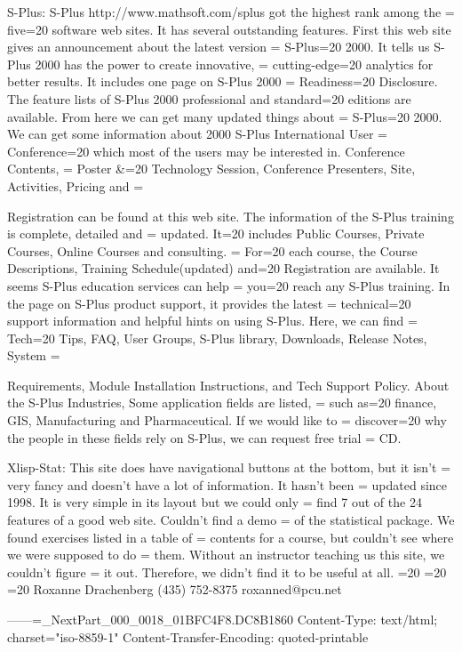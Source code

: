 S-Plus:
    S-Plus http://www.mathsoft.com/splus got the highest rank among the =
five=20
software web sites. It has several outstanding features.
    First this web site gives an announcement about the latest version =
S-Plus=20
2000. It tells us S-Plus 2000 has the power to create innovative, =
cutting-edge=20
analytics for better results. It includes one page on S-Plus 2000 =
Readiness=20
Disclosure. The feature lists of S-Plus 2000 professional and standard=20
editions are available. From here we can get many updated things about =
S-Plus=20
2000.
    We can get some information about 2000 S-Plus International User =
Conference=20
which most of the users may be interested in. Conference Contents, =
Poster &=20
Technology Session, Conference Presenters, Site, Activities, Pricing and =

Registration can be found at this web site.
    The information of the S-Plus training is complete, detailed and =
updated. It=20
includes Public Courses, Private Courses, Online Courses and consulting. =
For=20
each course, the Course Descriptions, Training Schedule(updated) and=20
Registration are available. It seems S-Plus education services can help =
you=20
reach any S-Plus training.
    In the page on S-Plus product support, it provides the latest =
technical=20
support information and helpful hints on using S-Plus. Here, we can find =
Tech=20
Tips, FAQ, User Groups, S-Plus library, Downloads, Release Notes, System =

Requirements, Module Installation Instructions, and Tech Support Policy.
    About the S-Plus Industries, Some application fields are listed, =
such as=20
finance, GIS, Manufacturing and Pharmaceutical. If we would like to =
discover=20
why the people in these fields rely on S-Plus, we can request free trial =
CD.


Xlisp-Stat:
    This site does have navigational buttons at the bottom, but it isn't =
very fancy and doesn't have a lot of information.  It hasn't been =
updated since 1998.  It is very simple in its layout but we could only =
find 7 out of the 24 features of a good web site.  Couldn't find a demo =
of the statistical package.  We found exercises listed in a table of =
contents for a course, but couldn't see where we were supposed to do =
them.  Without an instructor teaching us this site, we couldn't figure =
it out.  Therefore, we didn't find it to be useful at all.
=20
=20
=20
Roxanne Drachenberg
(435) 752-8375
roxanned@pcu.net

------=_NextPart_000_0018_01BFC4F8.DC8B1860
Content-Type: text/html;
	charset="iso-8859-1"
Content-Transfer-Encoding: quoted-printable

